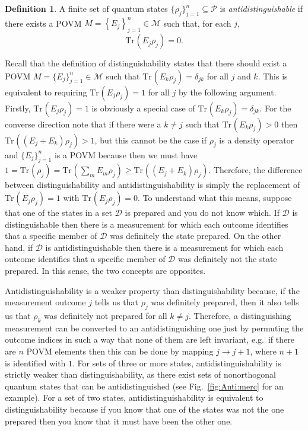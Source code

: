 \documentclass[DIV=calc,paper=a4,fontsize=11pt,twocolumn]{scrartcl} %
\theoremstyle{definition}
\newtheorem{definition}{Definition}[section]
\theoremstyle{plain}
\newcommand{\Tr}[2][]{\ensuremath{\text{Tr}_{#1} \left ( #2 \right )}}
\begin{document}
\begin{definition}
A finite set of quantum states $\{\rho_j\}_{j=1}^n \subseteq
\mathcal{P}$ is \emph{antidistinguishable} if there exists a POVM $M
= \left \{ E_j \right \}_{j=1}^n \in \mathcal{M}$ such that, for
each $j$,
\begin{equation}
\Tr{E_j \rho_j} = 0.
\end{equation}
\end{definition}

Recall that the definition of distinguishability states that there
should exist a POVM $M = \{E_j\}_{j=1}^n \in \mathcal{M}$ such that
$\Tr{E_k\rho_j} = \delta_{jk}$ for all $j$ and $k$.  This is
equivalent to requiring $\Tr{E_j \rho_j} = 1$ for all $j$ by the
following argument.  Firstly, $\Tr{E_j\rho_j} = 1$ is obviously a
special case of $\Tr{E_k \rho_j} = \delta_{jk}$.  For the converse
direction note that if there were a $k \neq j$ such that $\Tr{E_k
\rho_j} > 0$ then $\Tr{\left ( E_j + E_k \right ) \rho_j} > 1$, but
this cannot be the case if $\rho_j$ is a density operator and
$\{E_j\}_{j=1}^n$ is a POVM because then we must have $1 = \Tr{\rho_j}
= \Tr{\sum_m E_m \rho_j} \geq \Tr{\left ( E_j + E_k \right ) \rho_j}$.
Therefore, the difference between distinguishability and
antidistinguishability is simply the replacement of $\Tr{E_j \rho_j} =
1$ with $\Tr{E_j \rho_j} = 0$.  To understand what this means, suppose
that one of the states in a set $\mathcal{D}$ is prepared and you do
not know which.  If $\mathcal{D}$ is distinguishable then there is a
measurement for which each outcome identifies that a specific member
of $\mathcal{D}$ was definitely the state prepared.  On the other
hand, if $\mathcal{D}$ is antidistinguishable then there is a
measurement for which each outcome identifies that a specific member
of $\mathcal{D}$ was definitely not the state prepared.  In this
sense, the two concepts are opposites.

Antidistinguishability is a weaker property than distinguishability
because, if the measurement outcome $j$ tells us that $\rho_j$ was
definitely prepared, then it also tells us that $\rho_k$ was
definitely not prepared for all $k \neq j$.  Therefore, a
distinguishing measurement can be converted to an antidistinguishing
one just by permuting the outcome indices in such a way that none of
them are left invariant, e.g.\ if there are $n$ POVM elements then
this can be done by mapping $j \rightarrow j+1$, where $n+1$ is
identified with $1$.  For sets of three or more states,
antidistinguishability is strictly weaker than distinguishability, as
there exist sets of nonorthogonal quantum states that can be
antidistinguished (see Fig.~\ref{fig:Anti:merc} for an example).  For
a set of two states, antidistinguishability is equivalent to
distinguishability because if you know that one of the states was not
the one prepared then you know that it must have been the other one.
\end{document}

